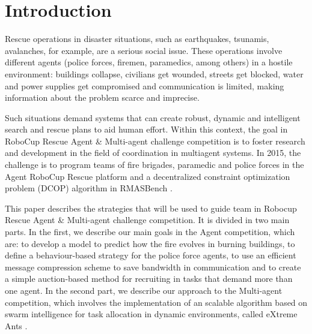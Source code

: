 \section{Introduction}
\label{sec:intro}

Rescue operations in disaster situations, such as earthquakes, tsunamis, avalanches, for example, are a serious social issue. These operations involve different agents (police forces, firemen, paramedics, among others) in a hostile environment: buildings collapse, civilians get wounded, streets get blocked, water and power supplies get compromised and communication is limited, making information about the problem scarce and imprecise.

Such situations demand systems that can create robust, dynamic and intelligent search and rescue plans to aid human effort. Within this context, the goal in RoboCup Rescue Agent \& Multi-agent challenge competition is to foster research and development in the field of coordination in multiagent systems. In 2015, the challenge is to program teams of fire brigades, paramedic and police forces in the Agent RoboCup Rescue platform \citep{Kitano2000} and a decentralized constraint optimization problem (DCOP) algorithm in RMASBench \citep{Kleiner+2013}. 


This paper describes the strategies that will be used to guide \teamname team in  Robocup Rescue Agent \& Multi-agent challenge competition. It is divided in two main parts. In the first, we describe our main goals in the Agent competition, which are: to develop a model to predict how the fire evolves in burning buildings, to define a behaviour-based strategy for the police force agents, to use an efficient message compression scheme to save bandwidth in communication and to create a simple auction-based method for recruiting in tasks that demand more than one agent. In the second part, we describe our approach to the Multi-agent competition, which involves the implementation of an scalable algorithm based on swarm intelligence for task allocation in dynamic environments, called eXtreme Ants \citep{Santos&Bazzan2009optmas}.
